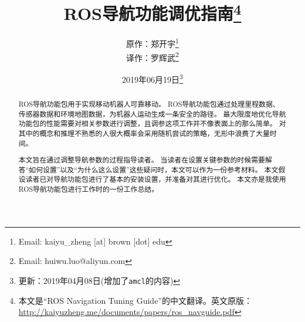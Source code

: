 \documentclass[lang=cn, zihao =-4]{elegantpaper}
\title{ROS导航功能调优指南\thanks{本文是``ROS Navigation Tuning Guide''的中文翻译。英文原版：\url{http://kaiyuzheng.me/documents/papers/ros_navguide.pdf}}}
\author{{\kaishu 原作}：郑开宇\thanks{Email: kaiyu\_zheng [at] brown [dot] edu}\\
{\kaishu 译作}：罗辉武\thanks{Email: huiwu.luo@aliyun.com}}
\date{2019年06月19日\footnote{更新：2019年04月08日(增加了\texttt{amcl}的内容)}}
\begin{document}
{
	\maketitle
}

\begin{abstract}
\normalsize
\indent ROS导航功能包用于实现移动机器人可靠移动。
ROS导航功能包通过处理里程数据、传感器数据和环境地图数据，为机器人运动生成一条安全的路径。
最大限度地优化导航功能包的性能需要对相关参数进行调整，且调参这项工作并不像表面上的那么简单。
对其中的概念和推理不熟悉的人很大概率会采用随机尝试的策略，无形中浪费了大量时间。

本文旨在通过调整导航参数的过程指导读者。
当读者在设置关键参数的时候需要解答“如何设置”以及“为什么这么设置”这些疑问时，本文可以作为一份参考材料。
本文假设读者已对导航功能包进行了基本的安装设置，并准备对其进行优化。
本文亦是我使用ROS导航功能包进行工作时的一份工作总结。
\end{abstract}

{
	\hypersetup{linkcolor=blue}%
	\tableofcontents
}

\begin{refsection}
	
	\nocite{*}
	\printbibliography[heading=subbibliography,title=【参考文献】]
\end{refsection}
\end{document}
